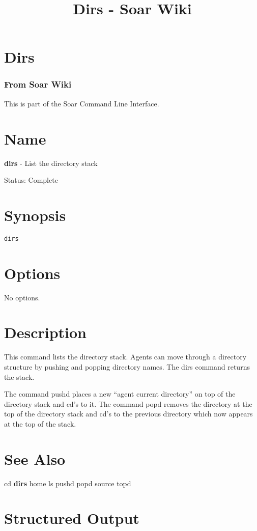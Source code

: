 \documentclass[10pt]{article}
\title{Dirs - Soar Wiki}
\begin{document}
\section*{Dirs}
\subsubsection*{From Soar Wiki}


 This is part of the Soar Command Line Interface. 
\section*{ Name }


 \textbf{dirs}
 - List the directory stack 


 Status: Complete
\section*{ Synopsis }
\begin{verbatim}
dirs

\end{verbatim}
\section*{ Options }


 No options. 
\section*{ Description }


 This command lists the directory stack. Agents can move through a directory structure by pushing and popping directory names. The dirs command returns the stack. 


 The command pushd places a new ``agent current directory'' on top of the directory stack and cd's to it. The command popd removes the directory at the top of the directory stack and cd's to the previous directory which now appears at the top of the stack. 
\section*{ See Also }
\begin{description}
cd \textbf{dirs}
 home ls pushd popd source topd

\end{description}
\section*{ Structured Output }
\end{document}
